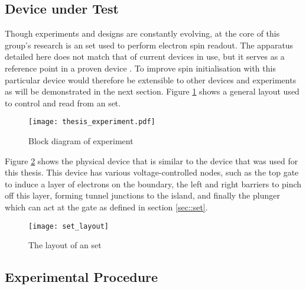 \label{sec::real-time}
\subsection{Device under Test}
\label{sec::experiment}
Though experiments and designs are constantly evolving, at the core of this group's research is an \gls{set} used to perform electron spin readout. The apparatus detailed here does not match that of current devices in use, but it serves as a reference point in a proven device \cite{morello2010single}. To improve spin initialisation with this particular device would therefore be extensible to other devices and experiments as will be demonstrated in the next section.
Figure \ref{fig::thesis_experiment} shows a general layout used to control and read from an \gls{set}.

\begin{figure}[htbp!]
	\centering
	\texttt{[image: thesis\_experiment.pdf]}
	\caption{Block diagram of experiment}
	\label{fig::thesis_experiment}
\end{figure}


Figure \ref{fig::set_layout} shows the physical device that is similar to the device that was used for this thesis. This device has various voltage-controlled nodes, such as the top gate to induce a layer of electrons on the boundary, the left and right barriers to pinch off this layer, forming tunnel junctions to the island, and finally the plunger which can act at the gate as defined in section \ref{sec::set}.

\begin{figure}[htbp!]
	\centering
	\texttt{[image: set\_layout]}
	\caption[Layout of an \gls{set}]{The layout of an \gls{set}\cite{morello2010single}}
	\label{fig::set_layout}
\end{figure}


\subsection{Experimental Procedure}

